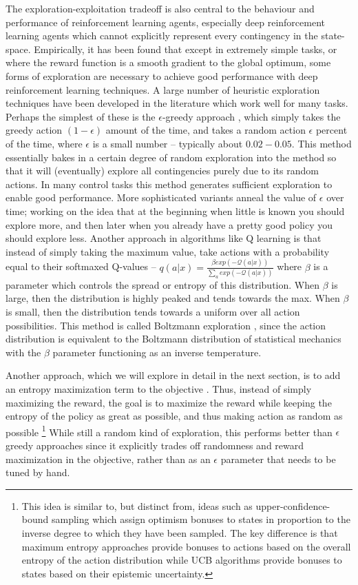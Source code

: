 The exploration-exploitation tradeoff is also central to the behaviour and performance of reinforcement learning agents, especially deep reinforcement learning agents which cannot explicitly represent every contingency in the state-space. Empirically, it has been found that except in extremely simple tasks, or where the reward function is a smooth gradient to the global optimum, some forms of exploration are necessary to achieve good performance with deep reinforcement learning techniques. A large number of heuristic exploration techniques have been developed in the literature which work well for many tasks. Perhaps the simplest of these is the $\epsilon$-greedy approach \citep{sutton1998introduction}, which simply takes the greedy action $(1 - \epsilon)$ amount of the time, and takes a random action $\epsilon$ percent of the time, where $\epsilon$ is a small number -- typically about $0.02-0.05$. This method essentially bakes in a certain degree of random exploration into the method so that it will (eventually) explore all contingencies purely due to its random actions. In many control tasks this method generates sufficient exploration to enable good performance. More sophisticated variants anneal the value of $\epsilon$ over time; working on the idea that at the beginning when little is known you should explore more, and then later when you already have a pretty good policy you should explore less. Another approach in algorithms like Q learning is that instead of simply taking the maximum value, take actions with a probability equal to their softmaxed Q-values -- $q(a | x) = \frac{\beta exp(-\mathcal{Q}(a | x))}{\sum_a exp(-\mathcal{Q}(a | x))}$ where $\beta$ is a parameter which controls the spread or entropy of this distribution. When $\beta$ is large, then the distribution is highly peaked and tends towards the max. When $\beta$ is small, then the distribution tends towards a uniform over all action possibilities. This method is called Boltzmann exploration \citep{cesa2017boltzmann}, since the action distribution is equivalent to the Boltzmann distribution of statistical mechanics with the $\beta$ parameter functioning as an inverse temperature.

Another approach, which we will explore in detail in the next section, is to add an entropy maximization term to the objective \citep{levine2018reinforcement}. Thus, instead of simply maximizing the reward, the goal is to maximize the reward while keeping the entropy of the policy as great as possible, and thus making action as random as possible \footnote{This idea is similar to, but distinct from, ideas such as upper-confidence-bound sampling which assign optimism bonuses to states in proportion to the inverse degree to which they have been sampled. The key difference is that maximum entropy approaches provide bonuses to actions based on the overall entropy of the action distribution while UCB algorithms provide bonuses to states based on their epistemic uncertainty.} While still a random kind of exploration, this performs better than $\epsilon$ greedy approaches since it explicitly trades off randomness and reward maximization in the objective, rather than as an $\epsilon$ parameter that needs to be tuned by hand.

